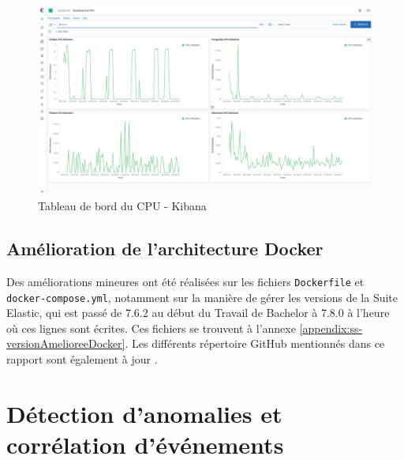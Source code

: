 \documentclass[paper=a4, fontsize=11pt]{scrartcl}
\begin{document}
\begin{figure}[H]
    \centering
    \includegraphics[width=18cm]{img/screenshots/dashboardOfCPU.png}
    \caption{Tableau de bord du CPU - Kibana}
    \label{f-dashboardOfCPU}
\end{figure}

\subsection{Amélioration de l'architecture Docker}
Des améliorations mineures ont été réalisées sur les fichiers \verb,Dockerfile, et \verb,docker-compose.yml,, notamment sur la manière de gérer les versions de la Suite Elastic, qui est passé de 7.6.2 au début du Travail de Bachelor à 7.8.0 à l'heure où ces lignes sont écrites. Ces fichiers se trouvent à l'annexe \ref{appendix:ss-versionAmelioreeDocker}. Les différents répertoire GitHub mentionnés dans ce rapport sont également à jour \cite{jael24_jael24tb_elasticstack_2020, jael24_jael24tb_fielddevices_2020, jael24_jael24tb_grideye_simulator_2020}.

\newpage

\section{Détection d'anomalies et corrélation d'événements} \label{s-detectionAnomaliesEtCorrelationEvenements}
\end{document}
